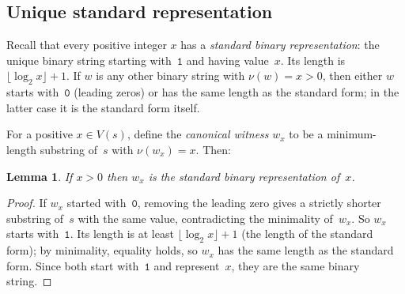 ﻿\documentclass[11pt,a4paper]{article}
\theoremstyle{plain}
\newtheorem{lemma}[theorem]{Lemma}
\theoremstyle{definition}
\theoremstyle{remark}
\newcommand{\val}{\nu}
\begin{document}
\subsection{Unique standard representation}

Recall that every positive integer $x$ has a \emph{standard binary
representation}: the unique binary string starting with~$\mathtt{1}$
and having value~$x$.  Its length is $\lfloor\log_2 x\rfloor+1$.
If $w$ is any other binary string with $\val(w)=x>0$, then either $w$
starts with~$\mathtt{0}$ (leading zeros) or has the same length as the
standard form; in the latter case it is the standard form itself.

For a positive $x\in V(s)$, define the \emph{canonical witness}
$w_x$ to be a minimum-length substring of~$s$ with $\val(w_x)=x$.
Then:

\begin{lemma}\label{lem:canon}
If $x>0$ then $w_x$ is the standard binary representation of~$x$.
\end{lemma}

\begin{proof}
If $w_x$ started with~$\mathtt{0}$, removing the leading zero gives a
strictly shorter substring of~$s$ with the same value, contradicting
the minimality of~$w_x$.  So $w_x$ starts with~$\mathtt{1}$.  Its
length is at least $\lfloor\log_2 x\rfloor+1$ (the length of the
standard form); by minimality, equality holds, so $w_x$ has the same
length as the standard form.  Since both start with~$\mathtt{1}$ and
represent~$x$, they are the same binary string.
\end{proof}
\end{document}
